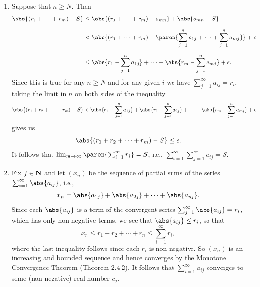 \documentclass{lew98_solutions}
\begin{document}
\begin{solution}
    \begin{enumerate}
        \item Suppose that \( n \geq N \). Then
        \begin{align*}
            \abs{(r_1 + \cdots + r_m) - S} &\leq \abs{(r_1 + \cdots + r_m) - s_{mn}} + \abs{s_{mn} - S} \\[2mm]
            &< \abs{(r_1 + \cdots + r_m) - \paren{ \sum_{j=1}^n a_{1j} + \cdots + \sum_{j=1}^n a_{mj} }} + \epsilon \\[2mm]
            &\leq \abs{r_1 - \sum_{j=1}^n a_{1j}} + \cdots + \abs{r_m - \sum_{j=1}^n a_{mj}} + \epsilon.
        \end{align*}
        Since this is true for any \( n \geq N \) and for any given \( i \) we have \( \sum_{j=1}^{\infty} a_{ij} = r_i \), taking the limit in \( n \) on both sides of the inequality
        \[
            \abs{(r_1 + r_2 + \cdots + r_m) - S} < \abs{r_1 - \sum_{j=1}^n a_{1j}} + \abs{r_2 - \sum_{j=1}^n a_{2j}} + \cdots + \abs{r_m - \sum_{j=1}^n a_{mj}} + \epsilon
        \]
        gives us
        \[
            \abs{(r_1 + r_2 + \cdots + r_m) - S} \leq \epsilon.
        \]
        It follows that \( \lim_{m \to \infty} \paren{ \sum_{i=1}^m r_i } = S \), i.e., \( \sum_{i=1}^{\infty} \sum_{j=1}^{\infty} a_{ij} = S \).

        \item Fix \( j \in \mathbf{N} \) and let \( (x_n) \) be the sequence of partial sums of the series \( \sum_{i=1}^{\infty} \abs{a_{ij}} \), i.e.,
        \[
            x_n = \abs{a_{1j}} + \abs{a_{2j}} + \cdots + \abs{a_{nj}}.
        \]
        Since each \( \abs{a_{ij}} \) is a term of the convergent series \( \sum_{j=1}^{\infty} \abs{a_{ij}} = r_i \), which has only non-negative terms, we see that \( \abs{a_{ij}} \leq r_i \), so that
        \[
            x_n \leq r_1 + r_2 + \cdots + r_n \leq \sum_{i=1}^{\infty} r_i,
        \]
        where the last inequality follows since each \( r_i \) is non-negative. So \( (x_n) \) is an increasing and bounded sequence and hence converges by the Monotone Convergence Theorem (Theorem 2.4.2). It follows that \( \sum_{i=1}^{\infty} a_{ij} \) converges to some (non-negative) real number \( c_j \).


\end{enumerate}
\end{solution}
\end{document}

